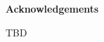 \thispagestyle{empty}

\begin{center}
  {\bf \Huge Acknowledgements}
\end{center}

\vspace{4cm}


TBD
